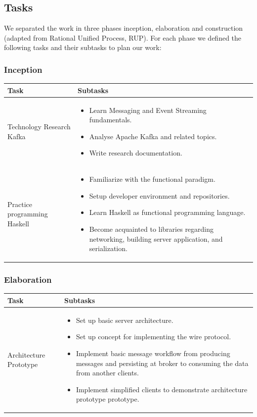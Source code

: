 \newpage
\subsection{Tasks}
We separated the work in three phases inception, elaboration and construction
(adapted from Rational Unified Process, RUP). For each phase we defined the
following tasks and their subtasks to plan our work:

\subsubsection{Inception}


\begin{tabular}[H]{|p{6cm}|p{10cm}|}\hline
    \textbf{Task} & \textbf{Subtasks} \\ \hline
    Technology Research Kafka & 
        \begin{itemize}
            \item Learn Messaging and Event Streaming fundamentals.
            \item Analyse Apache Kafka and related topics. 
            \item Write research documentation.
        \end{itemize} \\ \hline
    Practice programming Haskell & 
        \begin{itemize}
            \item Familiarize with the functional paradigm.
            \item Setup developer environment and repositories. 
            \item Learn Haskell as functional programming language.
            \item Become acquainted to libraries regarding networking,
              building server application, and serialization.
        \end{itemize} \\ \hline
\end{tabular}

\subsubsection{Elaboration}
\begin{tabular}[H]{|p{6cm}|p{10cm}|}\hline
   \textbf{Task} & \textbf{Subtasks} \\ \hline
    Architecture Prototype &
        \begin{itemize}
            \item Set up basic server architecture.
            \item Set up concept for implementing the wire protocol.
            \item Implement basic message workflow from producing messages and
            persisting at broker to consuming the data from another clients.
            \item Implement simplified clients to demonstrate architecture
                prototype prototype.
        \end{itemize} \\ \hline
   \end{tabular}

